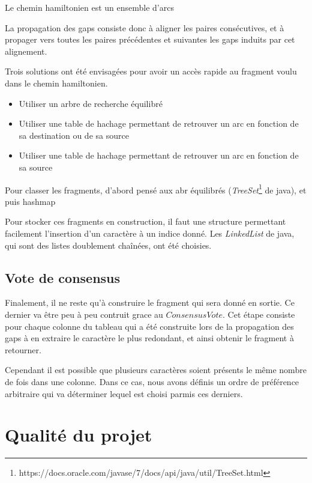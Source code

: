 \documentclass{article}
\begin{document}
Le chemin hamiltonien est un ensemble d'arcs 

La propagation des gaps consiste donc à aligner les paires consécutives, et à propager vers toutes les paires précédentes et suivantes les gaps induits par cet alignement.

Trois solutions ont été envisagées pour avoir un accès rapide au fragment voulu dans le chemin hamiltonien.
\begin{itemize}
\item Utiliser un arbre de recherche équilibré 
\item Utiliser une table de hachage permettant de retrouver un arc en fonction de sa destination ou de sa source


\item Utiliser une table de hachage permettant de retrouver un arc en fonction de sa source
\end{itemize}



Pour classer les fragments, d'abord pensé aux abr équilibrés (\textit{TreeSet}\footnote{https://docs.oracle.com/javase/7/docs/api/java/util/TreeSet.html} de java), et puis hashmap

Pour stocker ces fragments en construction, il faut une structure permettant facilement l'insertion d'un caractère à un indice donné. Les \textit{LinkedList} de java, qui sont des listes doublement chaînées, ont été choisies.

\subsection{Vote de consensus}

Finalement, il ne reste qu'à construire le fragment qui sera donné en sortie. Ce dernier va être peu à peu contruit grace au $ConsensusVote$. Cet étape consiste pour chaque colonne du tableau qui a été construite lors de la propagation des gaps à en extraire le caractère le plus redondant, et ainsi obtenir le fragment à retourner.

Cependant il est possible que plusieurs caractères soient présents le même nombre de fois dans une colonne. Dans ce cas, nous avons définis un ordre de préférence arbitraire qui va déterminer lequel est choisi parmis ces derniers.

\section{Qualité du projet}
\end{document}
